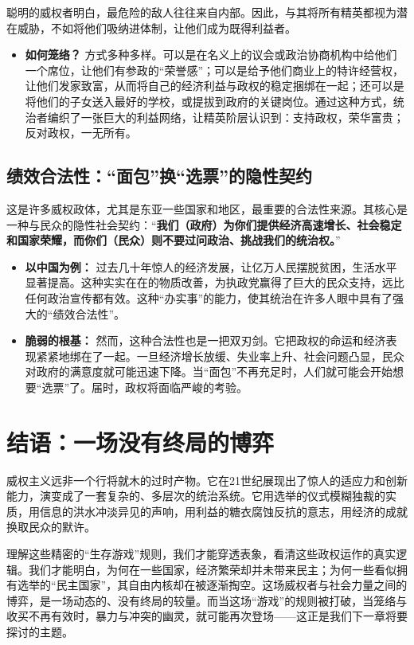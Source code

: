 \documentclass[a5paper, 11pt, openany]{ctexbook}
\begin{document}
聪明的威权者明白，最危险的敌人往往来自内部。因此，与其将所有精英都视为潜在威胁，不如将他们吸纳进体制，让他们成为既得利益者。
\begin{itemize}
    \item \textbf{如何笼络？} 方式多种多样。可以是在名义上的议会或政治协商机构中给他们一个席位，让他们有参政的“荣誉感”；可以是给予他们商业上的特许经营权，让他们发家致富，从而将自己的经济利益与政权的稳定捆绑在一起；还可以是将他们的子女送入最好的学校，或提拔到政府的关键岗位。通过这种方式，统治者编织了一张巨大的利益网络，让精英阶层认识到：支持政权，荣华富贵；反对政权，一无所有。
\end{itemize}

\subsection{绩效合法性：“面包”换“选票”的隐性契约}

这是许多威权政体，尤其是东亚一些国家和地区，最重要的合法性来源。其核心是一种与民众的隐性社会契约：“\textbf{我们（政府）为你们提供经济高速增长、社会稳定和国家荣耀，而你们（民众）则不要过问政治、挑战我们的统治权。}”
\begin{itemize}
    \item \textbf{以中国为例：} 过去几十年惊人的经济发展，让亿万人民摆脱贫困，生活水平显著提高。这种实实在在的物质改善，为执政党赢得了巨大的民众支持，远比任何政治宣传都有效。这种“办实事”的能力，使其统治在许多人眼中具有了强大的“绩效合法性”。
    \item \textbf{脆弱的根基：} 然而，这种合法性也是一把双刃剑。它把政权的命运和经济表现紧紧地绑在了一起。一旦经济增长放缓、失业率上升、社会问题凸显，民众对政府的满意度就可能迅速下降。当“面包”不再充足时，人们就可能会开始想要“选票”了。届时，政权将面临严峻的考验。
\end{itemize}

\section*{结语：一场没有终局的博弈}

威权主义远非一个行将就木的过时产物。它在21世纪展现出了惊人的适应力和创新能力，演变成了一套复杂的、多层次的统治系统。它用选举的仪式模糊独裁的实质，用信息的洪水冲淡异见的声响，用利益的糖衣腐蚀反抗的意志，用经济的成就换取民众的默许。

理解这些精密的“生存游戏”规则，我们才能穿透表象，看清这些政权运作的真实逻辑。我们才能明白，为何在一些国家，经济繁荣却并未带来民主；为何一些看似拥有选举的“民主国家”，其自由内核却在被逐渐掏空。这场威权者与社会力量之间的博弈，是一场动态的、没有终局的较量。而当这场“游戏”的规则被打破，当笼络与收买不再有效时，暴力与冲突的幽灵，就可能再次登场——这正是我们下一章将要探讨的主题。
\end{document}
